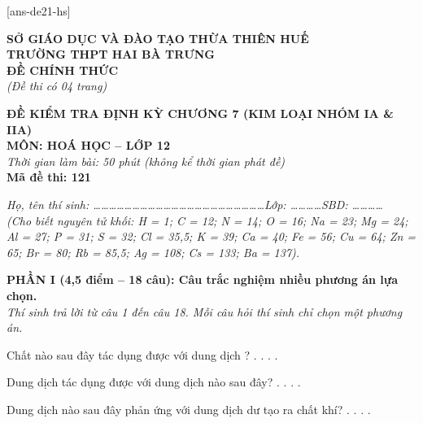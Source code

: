 \documentclass[11pt,a4paper]{article}
\def\loigiai#1{}
\begin{document}
[ans-de21-hs]

\noindent
\begin{minipage}[t]{0.48\textwidth}
	\textbf{SỞ GIÁO DỤC VÀ ĐÀO TẠO THỪA THIÊN HUẾ}\\
	\textbf{TRƯỜNG THPT HAI BÀ TRƯNG}\\
	\textbf{ĐỀ CHÍNH THỨC}\\
	\textit{(Đề thi có 04 trang)}
\end{minipage}\hfill
\begin{minipage}[t]{0.48\textwidth}
	\raggedleft
	\textbf{\color{mainGreen}ĐỀ KIỂM TRA ĐỊNH KỲ CHƯƠNG 7 (KIM LOẠI NHÓM IA \& IIA)}\\
	\textbf{MÔN: HOÁ HỌC -- LỚP 12}\\
	\textit{Thời gian làm bài: 50 phút (không kể thời gian phát đề)}\\
	\textbf{Mã đề thi: 121}
\end{minipage}


\vspace{1pt}
\noindent\textit{Họ, tên thí sinh: \dots\dots\dots\dots\dots\dots\dots\dots\dots\dots\dots\dots\dots\dots\dots\dots\dots\dots\dots\dots\dots\dots Lớp: \dots\dots\dots\dots SBD: \dots\dots\dots\dots}\\
\noindent\textit{(Cho biết nguyên tử khối: H = 1; C = 12; N = 14; O = 16; Na = 23; Mg = 24; Al = 27; P = 31; S = 32; Cl = 35,5; K = 39; Ca = 40; Fe = 56; Cu = 64; Zn = 65; Br = 80; Rb = 85,5; Ag = 108; Cs = 133; Ba = 137).}

\vspace{1pt}
\noindent
\textbf{PHẦN I (4,5 điểm -- 18 câu): Câu trắc nghiệm nhiều phương án lựa chọn.}\\
\textit{Thí sinh trả lời từ câu 1 đến câu 18. Mỗi câu hỏi thí sinh chỉ chọn một phương án.}

\begin{ex}
Chất nào sau đây tác dụng được với dung dịch ?
\choice
{.}
{.}
{.}
{.}
\loigiai{}
\end{ex}

\begin{ex}
Dung dịch  tác dụng được với dung dịch nào sau đây?
\choice
{.}
{.}
{.}
{.}
\loigiai{}
\end{ex}

\begin{ex}
Dung dịch nào sau đây phản ứng với dung dịch  dư tạo ra chất khí?
\choice
{.}
{.}
{.}
{.}
\loigiai{}
\end{ex}
\end{document}
